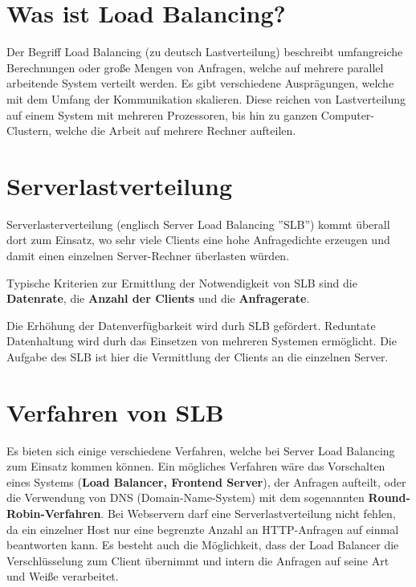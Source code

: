 


\section{Was ist Load Balancing?}\cite{Lastverteilung}
Der Begriff Load Balancing (zu deutsch Lastverteilung) beschreibt umfangreiche Berechnungen oder große Mengen von Anfragen, welche auf mehrere parallel arbeitende System verteilt werden. Es gibt verschiedene Ausprägungen, welche mit dem Umfang der Kommunikation skalieren. Diese reichen von
Lastverteilung auf einem System mit mehreren Prozessoren, bis hin zu ganzen Computer-Clustern, welche die Arbeit auf mehrere Rechner aufteilen.

\section{Serverlastverteilung}

Serverlasterverteilung (englisch Server Load Balancing ''SLB'') kommt überall dort zum Einsatz, wo sehr viele Clients eine hohe Anfragedichte erzeugen und damit einen einzelnen Server-Rechner überlasten würden.\newline

Typische Kriterien zur Ermittlung der Notwendigkeit von SLB sind die \textbf{Datenrate}, die \textbf{Anzahl der Clients} und die \textbf{Anfragerate}. \newline

Die Erhöhung der Datenverfügbarkeit wird durh SLB gefördert. Reduntate Datenhaltung wird durh das Einsetzen von mehreren Systemen ermöglicht. Die Aufgabe des SLB ist hier die Vermittlung der Clients an die einzelnen Server. \newline

\section{Verfahren von SLB}
Es bieten sich einige verschiedene Verfahren, welche bei Server Load Balancing zum Einsatz kommen können. Ein mögliches Verfahren wäre das Vorschalten eines Systems (\textbf{Load Balancer, Frontend Server}), der Anfragen aufteilt, oder die Verwendung von DNS (Domain-Name-System) mit dem sogenannten \textbf{Round-Robin-Verfahren}. Bei Webservern darf eine Serverlastverteilung nicht fehlen, da ein einzelner Host nur eine begrenzte Anzahl an HTTP-Anfragen auf einmal beantworten kann. Es besteht auch die Möglichkeit, dass der Load Balancer die Verschlüsselung zum Client übernimmt und intern die Anfragen auf seine Art und Weiße verarbeitet. \newline

